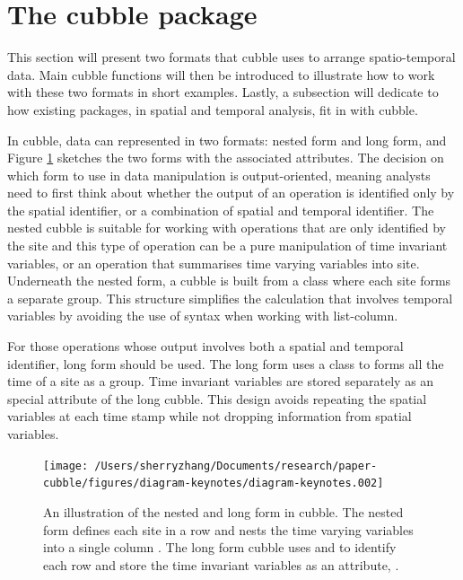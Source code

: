 \documentclass[
]{jss}
\begin{document}
\hypertarget{the-cubble-package}{%
\section{The cubble package}\label{the-cubble-package}}

This section will present two formats that cubble uses to arrange
spatio-temporal data. Main cubble functions will then be introduced to
illustrate how to work with these two formats in short examples. Lastly,
a subsection will dedicate to how existing packages, in spatial and
temporal analysis, fit in with cubble.

In cubble, data can represented in two formats: nested form and long
form, and Figure \ref{fig:illu-cubble} sketches the two forms with the
associated attributes. The decision on which form to use in data
manipulation is output-oriented, meaning analysts need to first think
about whether the output of an operation is identified only by the
spatial identifier, or a combination of spatial and temporal identifier.
The nested cubble is suitable for working with operations that are only
identified by the site and this type of operation can be a pure
manipulation of time invariant variables, or an operation that
summarises time varying variables into site. Underneath the nested form,
a cubble is built from a  class where each site forms a
separate group. This structure simplifies the calculation that involves
temporal variables by avoiding the use of  syntax
when working with list-column.

For those operations whose output involves both a spatial and temporal
identifier, long form should be used. The long form uses a
 class to forms all the time of a site as a group. Time
invariant variables are stored separately as an special attribute of the
long cubble. This design avoids repeating the spatial variables at each
time stamp while not dropping information from spatial variables.

\begin{CodeChunk}
\begin{figure}

{\centering \texttt{[image: /Users/sherryzhang/Documents/research/paper-cubble/figures/diagram-keynotes/diagram-keynotes.002]} 

}

\caption{An illustration of the nested and long form in cubble. The nested form defines each site in a row and nests the time varying variables into a single column . The long form cubble uses  and  to identify each row and store the time invariant variables as an attribute, .}\label{fig:illu-cubble}
\end{figure}
\end{CodeChunk}
\end{document}
